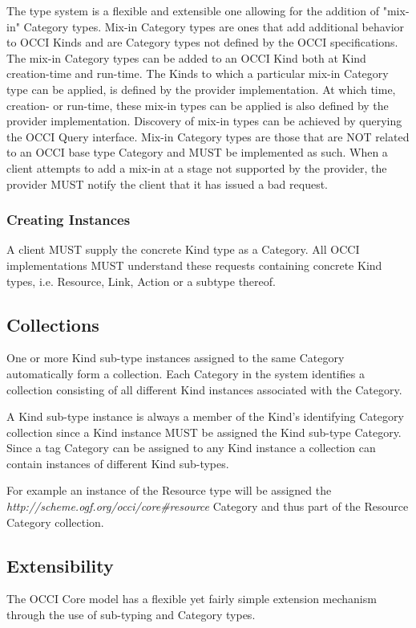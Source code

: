 \documentclass[10pt,a4paper]{article}
\begin{document}
The type system is a flexible and extensible one allowing for the addition of
"mix-in" Category types. Mix-in Category types are ones that add additional
behavior to OCCI Kinds and are Category types not defined by the OCCI
specifications. The mix-in Category types can be added to an OCCI Kind both at
Kind creation-time and run-time. The Kinds to which a particular mix-in
Category type can be applied, is defined by the provider implementation. At
which time, creation- or run-time, these mix-in types can be applied is also
defined by the provider implementation. Discovery of mix-in types can be
achieved by querying the OCCI Query interface. Mix-in Category types are those
that are NOT related to an OCCI base type Category and MUST be implemented as
such. When a client attempts to add a mix-in at a stage not supported by the
provider, the provider MUST notify the client that it has issued a bad request.

\subsubsection{Creating Instances}
A client MUST supply the concrete Kind type as a Category. All OCCI implementations MUST understand these requests containing concrete Kind types, i.e. Resource, Link, Action or a subtype thereof.

\subsection{Collections}
\label{sec:collection}

One or more Kind sub-type instances assigned to the same Category automatically
form a collection. Each Category in the system identifies a collection
consisting of all different Kind instances associated with the Category.

A Kind sub-type instance is always a member of the Kind's identifying Category
collection since a Kind instance MUST be assigned the Kind sub-type Category.
Since a tag Category can be assigned to any Kind instance a collection can
contain instances of different Kind sub-types.

For example an instance of the Resource type will be assigned the
\textit{http://scheme.ogf.org/occi/core\#resource} Category and thus part of the
Resource Category collection.


\subsection{Extensibility}
The OCCI Core model has a flexible yet fairly simple extension mechanism
through the use of sub-typing and Category types. 
\end{document}

